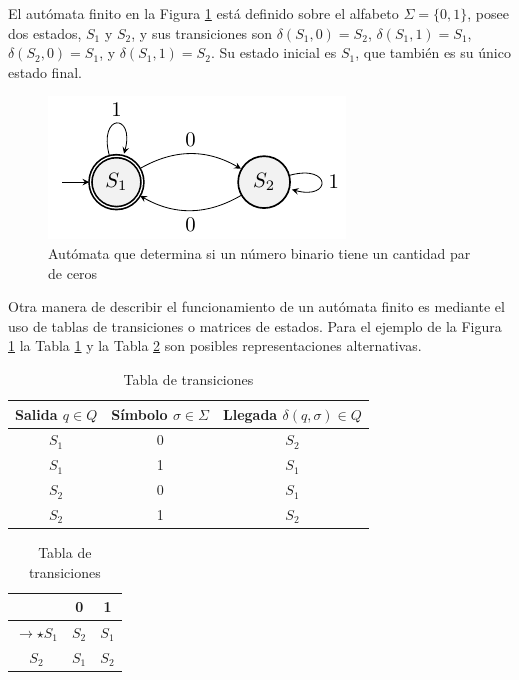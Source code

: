 \documentclass[journal,trans]{IEEEtran}
\begin{document}
	El autómata finito en la Figura \ref{fig:FSME} está definido sobre el alfabeto ${\Sigma}=\{0,1\}$, posee dos estados, $S_{1}$ y $S_{2}$, y sus transiciones son ${\delta}(S_{1}, 0)=S_{2}$, ${\delta}(S_{1}, 1)=S_{1}$, ${\delta}(S_{2}, 0)=S_{1}$, y ${\delta}(S_{1}, 1)=S_{2}$. Su estado inicial es $S_{1}$, que también es su único estado final.
	
	
	\begin{figure}[h]
		\centering
		\includegraphics{./imagenes/FSME.pdf}
		\caption{Autómata que determina si un número binario tiene un cantidad par de ceros}
		\label{fig:FSME}
	\end{figure}
	
	Otra manera de describir el funcionamiento de un autómata finito es mediante el uso de tablas de transiciones o matrices de estados. Para el ejemplo de la Figura \ref{fig:FSME} la Tabla \ref{tab:FSME} y la Tabla \ref{tab:FSMT} son posibles representaciones alternativas.
	
	\begin{table}[h]
		\centering
		\begin{tabular}{||c|c|c||}
			\hline
			\hline
			Salida $q \in Q$ & Símbolo $\sigma \in \Sigma$ & Llegada $\delta (q, \sigma) \in Q$ \\
			\hline
			$S_{1}$          & 0                           & $S_{2}$\\
			$S_{1}$          & 1                           & $S_{1}$\\
			$S_{2}$          & 0                           & $S_{1}$\\
			$S_{2}$          & 1                           & $S_{2}$\\
			\hline
			\hline
		\end{tabular}
		\caption{Tabla de transiciones}
		\label{tab:FSME}
	\end{table}
	
	\begin{table}[h]
		\centering
		\begin{tabular}{||c|c|c||}
			\hline
			\hline
			&  0      & 1\\
			\hline
			\hline
			${\to} {\star} S_{1}$ & $S_{2}$ & $S_{1}$\\
			\hline
			$S_{2}$               & $S_{1}$ & $S_{2}$\\
			\hline
			\hline
		\end{tabular}
		\caption{Tabla de transiciones}
		\label{tab:FSMT}
	\end{table}
	
\end{document}
